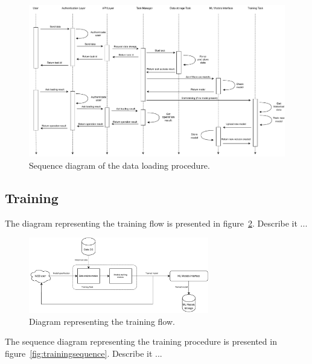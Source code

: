 \begin{figure}[H]
\centering 
\includegraphics[width=1\textwidth]{images/architecture_data_loading_sequence}
\caption{Sequence diagram of the data loading procedure.}
\label{fig:loadingsequence}
\end{figure}


\vspace{0.1 cm}
\subsection{Training}
\label{sec:loading}
\vspace{0.1 cm}

The diagram representing the training flow is presented in figure~\ref{fig:trainingflow}.
Describe it ...

\begin{figure}[H]
\centering 
\includegraphics[width=0.7\textwidth]{images/architecture_training_flow}
\caption{Diagram representing the training flow.}
\label{fig:trainingflow}
\end{figure}

The sequence diagram representing the training procedure is presented in figure~\ref{fig:trainingsequence}.
Describe it ...

